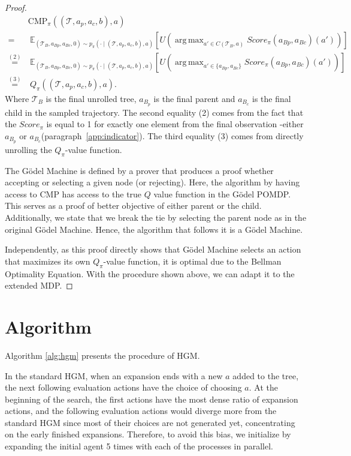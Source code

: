 \documentclass{article}
\DeclareMathOperator*{\argmax}{arg\,max}
\begin{document}
\begin{proof}
\begin{align*}
 &\mathrm{CMP}_{\pi}((\mathcal{T}, a_p, a_c, b),a) \\
 =& \ \mathbb{E}_{(\mathcal{T}_B, a_{Bp}, a_{Bc}, 0) \sim p_\pi(\cdot \mid (\mathcal{T}, a_p, a_c, b),a)}
 \left[   U(\argmax_{a' \in C(\mathcal{T}_B, a)}Score_\pi(a_{Bp}, a_{Bc})(a'))    \right]  \\
\overset{(2)}{=}& \ \mathbb{E}_{(\mathcal{T}_B, a_{Bp}, a_{Bc}, 0) \sim p_\pi(\cdot \mid (\mathcal{T}, a_p, a_c, b), a)}
 \left[   U(\argmax_{a' \in \{a_{Bp},a_{Bc}\}}Score_\pi(a_{Bp},a_{Bc})(a'))    \right]  \\
 \overset{(3)}{=}& \ Q_{\pi}((\mathcal{T}, a_p, a_c, b), a).
 \end{align*}
Where $\mathcal{T}_B$ is the final unrolled tree, $a_{B_p}$ is the final parent and $a_{B_c}$ is the final child in the sampled trajectory.
The second equality (2) comes from the fact that the $Score_\pi$ is equal to 1 for exactly one element from the final observation -either $a_{B_p}$ or $a_{B_c}$(paragraph~\ref{app:indicator}). The third equality (3) comes from directly unrolling the $Q_\pi$-value function. 

The G\"odel Machine is defined by a prover that produces a proof whether accepting or selecting a given node (or rejecting). Here, the algorithm by having access to $\mathrm{CMP}$ has access to the true $Q$ value function in the G\"odel POMDP. This serves as a proof of better objective of either parent or the child. Additionally, we state that we break the tie by selecting the parent node as in the original G\"odel Machine. Hence, the algorithm that follows it is a G\"odel Machine. 

Independently, as this proof directly shows that G\"odel Machine selects an action that maximizes its own $Q_\pi$-value function, it is optimal due to the Bellman Optimality Equation. With the procedure shown above, we can adapt it to the extended MDP. 




 \end{proof}




\newpage
\section{Algorithm}\label{app:alg}
Algorithm \ref{alg:hgm} presents the procedure of HGM.

In the standard HGM, when an expansion ends with a new $a$ added to the tree, the next following evaluation actions have the choice of choosing $a$.
At the beginning of the search, the first actions have the most dense ratio of expansion actions, and the following evaluation actions would diverge more from the standard HGM since most of their choices are not generated yet, concentrating on the early finished expansions. 
Therefore, to avoid this bias, we initialize by expanding the initial agent 5 times with each of the processes in parallel.
\end{document}
